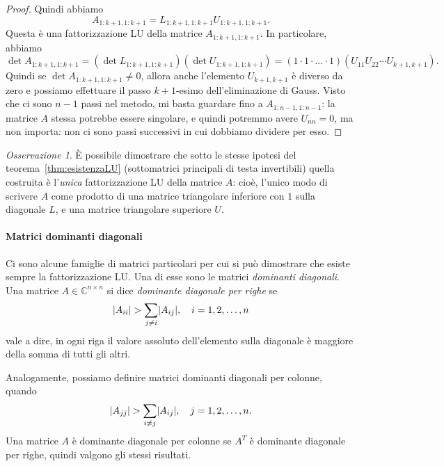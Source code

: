 \documentclass[a4paper]{report}
\DeclarePairedDelimiter{\abs}{\lvert}{\rvert}
\theoremstyle{definition}
\theoremstyle{remark}
\newtheorem{remark}[theorem]{Osservazione}
\begin{document}
\begin{proof}
Quindi abbiamo
\[
A_{1:k+1,1:k+1} = L_{1:k+1,1:k+1}U_{1:k+1,1:k+1}.
\]
Questa è una fattorizzazione LU della matrice $A_{1:k+1,1:k+1}$. In particolare, abbiamo
\[
\det A_{1:k+1,1:k+1} = (\det L_{1:k+1,1:k+1}) (\det U_{1:k+1,1:k+1}) = (1\cdot 1 \cdot \dots \cdot 1) (U_{11}U_{22}\cdots U_{k+1,k+1}).
\]
Quindi se $\det A_{1:k+1,1:k+1} \neq 0$, allora anche l'elemento $U_{k+1,k+1}$ è diverso da zero e possiamo effettuare il passo $k+1$-esimo dell'eliminazione di Gauss. Visto che ci sono $n-1$ passi nel metodo, mi basta guardare fino a $A_{1:n-1,1:n-1}$: la matrice $A$ stessa potrebbe essere singolare, e quindi potremmo avere $U_{nn}=0$, ma non importa: non ci sono passi successivi in cui dobbiamo dividere per esso.
\end{proof}

\begin{remark}
    È possibile dimostrare che sotto le stesse ipotesi del teorema~\ref{thm:esistenzaLU} (sottomatrici principali di testa invertibili) quella costruita è l'\emph{unica} fattorizzazione LU della matrice $A$: cioè, l'unico modo di scrivere $A$ come prodotto di una matrice triangolare inferiore con $1$ sulla diagonale $L$, e una matrice triangolare superiore $U$.
\end{remark}

\paragraph{Matrici dominanti diagonali}

Ci sono alcune famiglie di matrici particolari per cui si può dimostrare che esiste sempre la fattorizzazione LU. Una di esse sono le matrici \emph{dominanti diagonali}. Una matrice $A\in\mathbb{C}^{n\times n}$ si dice \emph{dominante diagonale per righe} se
\[
\abs{A_{ii}} > \sum_{j\neq i} \abs{A_{ij}}, \quad i=1,2,\dots,n
\]
vale a dire, in ogni riga il valore assoluto dell'elemento sulla diagonale è maggiore della somma di tutti gli altri.

Analogamente, possiamo definire matrici dominanti diagonali per colonne, quando
\[
\abs{A_{jj}} > \sum_{i\neq j} \abs{A_{ij}}, \quad j=1,2,\dots,n.
\]
Una matrice $A$ è dominante diagonale per colonne se $A^T$ è dominante diagonale per righe, quindi valgono gli stessi risultati.
\end{document}
